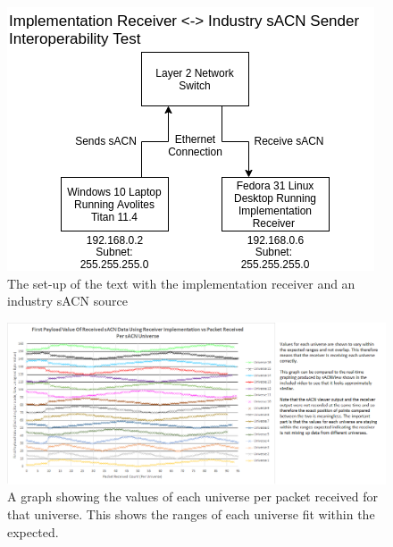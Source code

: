 \documentclass[11pt,a4paper]{article}
\begin{document}
\begin{figure}[H]
	\label{AVO_SETUP}
	\includegraphics[width=\textwidth]{CS4099-Avo-setup.png}
	\caption{The set-up of the text with the implementation receiver and an industry sACN source}
\end{figure}

\begin{figure}[H]
	\label{RCV_INTEROP_TEST_5_GRAPH}
	\includegraphics[width=\textwidth]{test-5-processed-first-value-chart}
	\caption{A graph showing the values of each universe per packet received for that universe. This shows the ranges of each universe fit within the expected.}
\end{figure}
\end{document}
